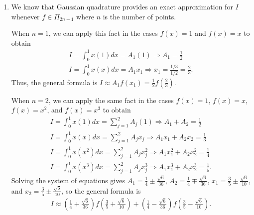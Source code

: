\documentclass[a4paper,12pt]{article}
\begin{document}
\begin{enumerate}
    \item
        We know that Gaussian quadrature provides an exact approximation for $I$ whenever $f \in \Pi_{2n - 1}$ where $n$ is the number of points. \par
        When $n = 1$, we can apply this fact in the cases $f(x) = 1$ and $f(x) = x$ to obtain
        \begin{gather*}
            I = \int_0^1 x(1) dx = A_1(1) \Rightarrow A_1 = \frac{1}{2} \\
            I = \int_0^1 x(x) dx = A_1 x_1 \Rightarrow x_1 = \frac{1/3}{1/2} = \frac{2}{3}.
        \end{gather*}
        Thus, the general formula is $I \approx A_1 f(x_1) = \frac{1}{2} f(\frac{2}{3})$. \par
        When $n = 2$, we can apply the same fact in the cases $f(x) = 1$, $f(x) = x$, $f(x) = x^2$, and $f(x) = x^3$ to obtain
        \begin{gather*}
            I = \int_0^1 x(1) dx = \sum_{j = 1}^2 A_j(1) \Rightarrow A_1 + A_2 = \frac{1}{2} \\
            I = \int_0^1 x(x) dx = \sum_{j = 1}^2 A_j x_j \Rightarrow A_1 x_1 + A_2 x_2 = \frac{1}{3} \\
            I = \int_0^1 x(x^2) dx = \sum_{j = 1}^2 A_j x_j^2 \Rightarrow A_1 x_1^2 + A_2 x_2^2 = \frac{1}{4} \\
            I = \int_0^1 x(x^3) dx = \sum_{j = 1}^2 A_j x_j^3 \Rightarrow A_1 x_1^3 + A_2 x_2^3 = \frac{1}{5}.
        \end{gather*}
        Solving the system of equations gives $A_1 = \frac{1}{4} \pm \frac{\sqrt{6}}{36}$, $A_2 = \frac{1}{4} \mp \frac{\sqrt{6}}{36}$, $x_1 = \frac{3}{5} \pm \frac{\sqrt{6}}{10}$, and $x_2 = \frac{3}{5} \pm \frac{\sqrt{6}}{10}$, so the general formula is
        \begin{align*}
            I \approx \left( \frac{1}{4} + \frac{\sqrt{6}}{36} \right) f \left( \frac{3}{5} + \frac{\sqrt{6}}{10} \right) + \left( \frac{1}{4} - \frac{\sqrt{6}}{36} \right) f \left( \frac{3}{5} - \frac{\sqrt{6}}{10} \right).
        \end{align*}


\end{enumerate}
\end{document}
